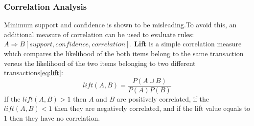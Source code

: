 \subsubsection{Correlation Analysis}
Minimum support and confidence is shown to be misleading\cite{Lin:2002:CSS:646420.693806}.To avoid this, an additional measure of correlation can be used to evaluate rules:\ $A\Rightarrow B [support, confidence, correlation]$. 
\textbf{Lift} is a simple correlation measure which compares the likelihood of the both items belong to the same transaction versus the likelihood of the two items belonging to two different transactions\ref{eq:lift}:  
\begin{equation}
	lift(A,B) = \frac{P(A\cup B)}{P(A)P(B)}
	\label{eq:lift}
\end{equation}
If the $lift(A,B) > 1$ then $A$ and $B$ are positively correlated,
if the $lift(A,B) < 1$ then they are negatively correlated, 
and if the lift value equals to 1  then they have no correlation. 


